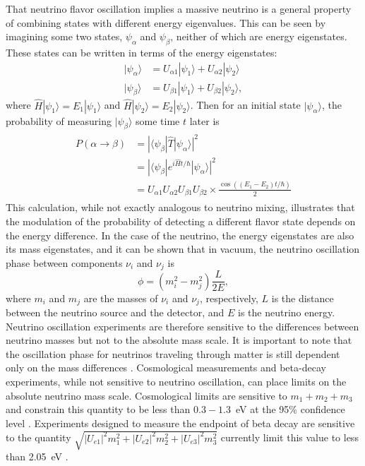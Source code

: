 That neutrino flavor oscillation implies a massive neutrino is a general property of combining states with different energy eigenvalues.  This can be seen by imagining some two states, $\psi_{\alpha}$ and $\psi_{\beta}$, neither of which are energy eigenstates.  These states can be written in terms of the energy eigenstates: 
\begin{align}
|\psi_{\alpha}\rangle &= U_{\alpha 1}|\psi_1\rangle + U_{\alpha 2}|\psi_2\rangle \\
|\psi_{\beta}\rangle &= U_{{\beta}1}|\psi_1\rangle + U_{{\beta}2}|\psi_2\rangle, 
\end{align}
where $\hat{H}|\psi_1\rangle = E_1|\psi_1\rangle$ and $\hat{H}|\psi_2\rangle = E_2|\psi_2\rangle$.  Then for an initial state $|\psi_{\alpha}\rangle$, the probability of measuring $|\psi_{\beta}\rangle$ some time $t$ later is
\begin{align}
\begin{split}
P(\alpha\rightarrow\beta) &=  |\langle\psi_{\beta}|\hat{T}|\psi_{\alpha}\rangle|^2 \\
                             &=  |\langle\psi_{\beta}|e^{i\hat{H}t / \hbar}|\psi_{\alpha}\rangle|^2 \\
                             &=  U_{{\alpha}1}U_{{\alpha}2}U_{{\beta}1}U_{{\beta}2} \times \frac{\cos((E_1 - E_2)t/\hbar)}{2} 
\end{split}
\end{align}
This calculation, while not exactly analogous to neutrino mixing, illustrates that the modulation of the probability of detecting a different flavor state depends on the energy difference.  In the case of the neutrino, the energy eigenstates are also its mass eigenstates, and it can be shown that in vacuum, the neutrino oscillation phase between components $\nu_i$ and $\nu_j$ is \citep{PDG,neutrinoOscillations}
\begin{equation}
\phi = (m_i^2 - m_j^2)\frac{L}{2E},
\end{equation}
where $m_i$ and $m_j$ are the masses of $\nu_i$ and $\nu_j$, respectively, $L$ is the distance between the neutrino source and the detector, and $E$ is the neutrino energy.  Neutrino oscillation experiments are therefore sensitive to the differences between neutrino masses but not to the absolute mass scale.  It is important to note that the oscillation phase for neutrinos traveling through matter is still dependent only on the mass differences \citep{MSW}.  Cosmological measurements and beta-decay experiments, while not sensitive to neutrino oscillation, can place limits on the absolute neutrino mass scale.  Cosmological limits are sensitive to $m_1+m_2+m_3$ and constrain this quantity to be less than $0.3-1.3$~eV at the 95\% confidence level \citep{cosmoNuMassLimit}.  Experiments designed to measure the endpoint of beta decay are sensitive to the quantity $\sqrt{|U_{e1}|^2m_1^2 + |U_{e2}|^2m_2^2 + |U_{e3}|^2m_3^2}$ currently limit this value to less than 2.05~eV \citep{tritiumEndpoint}. 


